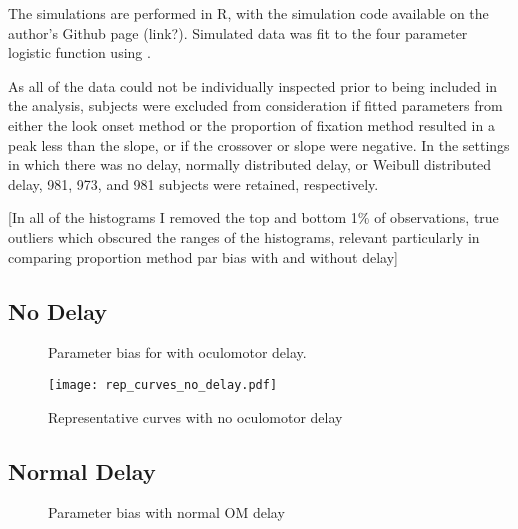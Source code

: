 The simulations are performed in R, with the simulation code available on the author's Github page (link?). Simulated data was fit to the four parameter logistic function using .

As all of the data could not be individually inspected prior to being included in the analysis, subjects were excluded from consideration if fitted parameters from either the look onset method or the proportion of fixation method resulted in a peak less than the slope, or if the crossover or slope were negative. In the settings in which there was no delay, normally distributed delay, or Weibull distributed delay, 981, 973, and 981 subjects were retained, respectively.

[In all of the histograms I removed the top and bottom 1\% of observations, true outliers which obscured the ranges of the histograms, relevant particularly in comparing proportion method  par bias with and without delay]

\subsection{No Delay}


\begin{figure}[H]
\centering
\caption{Parameter bias for with oculomotor delay. }
\label{fig:par_bias_no_delay}
\end{figure}

\begin{figure}[H]
\centering
\texttt{[image: rep\_curves\_no\_delay.pdf]}
\caption{Representative curves with no oculomotor delay}
\label{fig:rep_curves_no_delay}
\end{figure}



\subsection{Normal Delay}

\begin{figure}[H]
\centering
\caption{Parameter bias with normal OM delay}
\label{fig:par_bias_normal_delay}
\end{figure}


